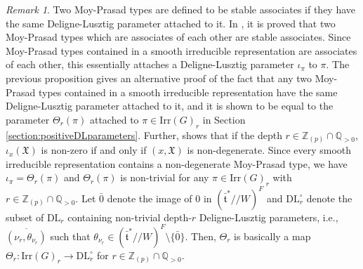 \documentclass[11 pt]{article}
\numberwithin{equation}{subsection}
\theoremstyle{definition}
\theoremstyle{remark}
\newtheorem{remark}[theorem]{Remark}
\theoremstyle{conjecture}
\newcommand{\X}{\mathfrak X}
\newcommand{\bt}{\bar{\mathfrak t}}
\newcommand{\Irr}{\mathrm{Irr}}
\newcommand{\DL}{\mathrm{DL}}
\newcommand{\Z}{\mathbb Z}
\newcommand{\Q}{\mathbb Q}
\begin{document}
\begin{remark}\label{remark nontrivial and alternativeproof}
   Two Moy-Prasad types are defined to be stable associates if they have the same Deligne-Lusztig parameter attached to it. In \cite[Lemma 36]{chendebackertsai}, it is proved that two Moy-Prasad types which are associates of each other are stable associates. Since Moy-Prasad types contained in a smooth irreducible representation are associates of each other, this essentially attaches a Deligne-Lusztig parameter $\iota_\pi$ to $\pi$. The previous proposition gives an alternative proof of the fact that any two Moy-Prasad types contained in a smooth irreducible representation have the same Deligne-Lusztig parameter attached to it, and it is shown to be equal to the parameter $\Theta_r(\pi)$ attached to $\pi\in \Irr(G)_r$ in Section \ref{section:positiveDLparameters}. Further, \cite[Lemma 33]{chendebackertsai} shows that if the depth $r\in \Z_{(p)} \cap \Q_{>0}$, $\iota_x(\X)$ is non-zero if and only if $(x,\X)$ is non-degenerate. Since every smooth irreducible representation contains a non-degenerate Moy-Prasad type, we have $\iota_\pi=\Theta_r(\pi)$ and $\Theta_r(\pi) $ is non-trivial for any $\pi \in \Irr(G)_r$ with $ r \in \Z_{(p)}\cap \Q_{>0}$. 
   Let $\bar 0$ denote the image of $0$ in $(\bt^*//W)^F$ and $\DL_r^\circ$ denote the subset of $\DL_r$ containing non-trivial depth-$r$ Deligne-Lusztig parameters, i.e., $\overline{(\nu_r,\theta_{\nu_r})}$ such that $\theta_{\nu_r}\in (\bt^*//W)^F \setminus \{\bar 0\}$. Then, $\Theta_r$ is basically a map $\Theta_r: \Irr(G)_r\rightarrow \DL_r^\circ$ for $ r \in \Z_{(p)}\cap \Q_{>0}$.
\end{remark}
\end{document}
